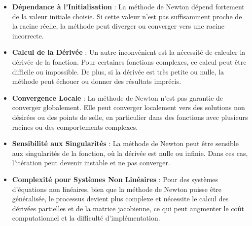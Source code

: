 \documentclass{article}
\begin{document}
\begin{itemize}
    \item \textbf{Dépendance à l'Initialisation} : La méthode de Newton dépend fortement de la valeur initiale choisie. Si cette valeur n'est pas suffisamment proche de la racine réelle, la méthode peut diverger ou converger vers une racine incorrecte.
    \item \textbf{Calcul de la Dérivée} : Un autre inconvénient est la nécessité de calculer la dérivée de la fonction. Pour certaines fonctions complexes, ce calcul peut être difficile ou impossible. De plus, si la dérivée est très petite ou nulle, la méthode peut échouer ou donner des résultats imprécis.
    \item \textbf{Convergence Locale} : La méthode de Newton n'est pas garantie de converger globalement. Elle peut converger localement vers des solutions non désirées ou des points de selle, en particulier dans des fonctions avec plusieurs racines ou des comportements complexes.
    \item \textbf{Sensibilité aux Singularités} : La méthode de Newton peut être sensible aux singularités de la fonction, où la dérivée est nulle ou infinie. Dans ces cas, l'itération peut devenir instable et ne pas converger.
    \item \textbf{Complexité pour Systèmes Non Linéaires} : Pour des systèmes d'équations non linéaires, bien que la méthode de Newton puisse être généralisée, le processus devient plus complexe et nécessite le calcul des dérivées partielles et de la matrice jacobienne, ce qui peut augmenter le coût computationnel et la difficulté d'implémentation.
\end{itemize}
\end{document}
